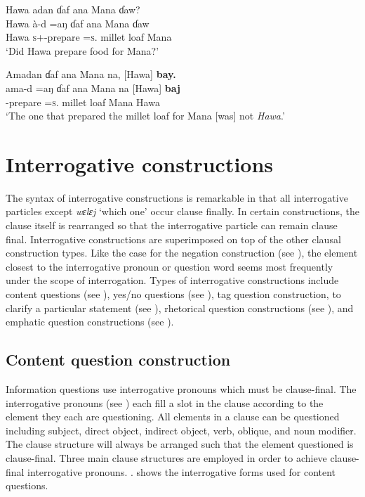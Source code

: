 \ea \label{ex:10:51}
Hawa  adan  ɗaf  ana  Mana  ɗaw?\\
\gll  Hawa   à-d  =aŋ    ɗaf  ana  Mana  ɗaw\\
      Hawa  \textsc{s}+{\PFV}-prepare =\textsc{s}.{\IO}  {millet loaf}  {\DAT} Mana  {\QUEST}\\
\glt  ‘Did Hawa prepare food for Mana?’
\z

\ea \label{ex:10:52}
Amadan  ɗaf  ana  Mana  na,  [Hawa]  \textbf{bay.}\\
\gll  ama-d =aŋ    ɗaf  ana  Mana  na  [Hawa]   \textbf{baj}\\
      {\DEP}-prepare =\textsc{s}.{\IO}  {millet loaf}  {\DAT} Mana  {\PSP}  Hawa   {\NEG}\\
\glt  ‘The one that prepared the millet loaf for Mana [was] not \textit{Hawa}.’
\z

\section{Interrogative constructions}\label{sec:10.3}
\hypertarget{RefHeading1212981525720847}{}
The syntax of interrogative constructions is remarkable in that all interrogative particles except \textit{wɛlɛj} ‘which one' occur clause finally. In certain constructions, the clause itself is rearranged so that the interrogative particle can remain clause final. Interrogative constructions are superimposed on top of the other clausal construction types. Like the case for the negation construction (see ), the element closest to the interrogative pronoun or question word seems most frequently under the scope of interrogation. Types of interrogative constructions include content questions (see ), yes/no questions (see ), tag question construction, to clarify a particular statement (see ), rhetorical question constructions (see ), and emphatic question constructions (see ).  

\subsection{Content question construction}\label{sec:10.3.1}
\hypertarget{RefHeading1213001525720847}{}
Information questions use interrogative pronouns which must be clause-final. The interrogative pronouns (see ) each fill a slot in the clause according to the element they each are questioning. All elements in a clause can be questioned including subject, direct object, indirect object, verb, oblique, and noun modifier. The clause structure will always be arranged such that the element questioned is clause-final. Three main clause structures are employed in order to achieve clause-final interrogative pronouns. . shows the interrogative forms used for content questions. 


